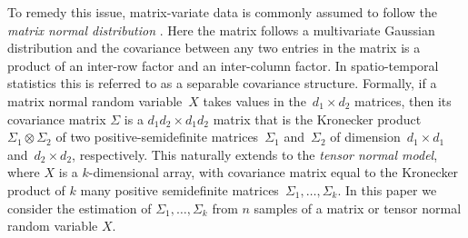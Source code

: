 \documentclass[aos]{imsart}
\theoremstyle{definition}
\numberwithin{equation}{section}
\newcommand{\ot}{\otimes}
\begin{document}
To remedy this issue, matrix-variate data is commonly assumed to follow the \emph{matrix normal distribution} \citep{dutilleul1999mle,werner2008estimation}.
Here the matrix follows a multivariate Gaussian distribution and the covariance between any two entries in the matrix is a product of an inter-row factor and an inter-column factor.
In spatio-temporal statistics this is referred to as a separable covariance structure.
Formally, if a matrix normal random variable~$X$ takes values in the~$d_1\times d_2$ matrices, then its covariance matrix $\Sigma$ is a $d_1d_2\times d_1 d_2$ matrix that is the Kronecker product~$\Sigma_1 \ot \Sigma_2$ of two positive-semidefinite matrices~$\Sigma_1$ and~$\Sigma_2$ of dimension~$d_1\times d_1$ and~$d_2\times d_2$, respectively.
This naturally extends to the \emph{tensor normal model}, where $X$ is a $k$-dimensional array, with covariance matrix equal to the Kronecker product of $k$ many positive semidefinite matrices~$\Sigma_1, \dots, \Sigma_k$.
In this paper we consider the estimation of $\Sigma_1, \dots, \Sigma_k$ from $n$ samples of a matrix or tensor normal random variable $X$.
\end{document}

